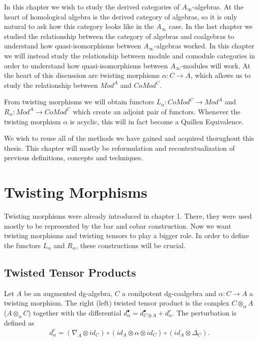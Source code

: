 \documentclass[../thesis.tex]{subfiles}
\begin{document}
    In this chapter we wish to study the derived categories of $A_\infty$-algebras. At the heart of homological algebra is the derived category of algebras, so it is only natural to ask how this category looks like in the $A_\infty$ case. In the last chapter we studied the relationship between the category of algebras and coalgebras to understand how quasi-isomorphisms between $A_\infty$-algebras worked. In this chapter we will instead study the relationship between module and comodule categories in order to understand how quasi-isomorphisms between $A_\infty$-modules will work. At the heart of this discussion are twisting morphisms $\alpha : C \rightarrow A$, which allows us to study the relationship between $Mod^A$ and $CoMod^C$.

    From twisting morphisms we will obtain functors $L_\alpha : CoMod^C \rightarrow Mod^A$ and $R_\alpha : Mod^A \rightarrow CoMod^C$ which create an adjoint pair of functors. Whenever the twisting morphism $\alpha$ is acyclic, this will in fact become a Quillen Equivalence.

    We wish to reuse all of the methods we have gained and acquired thorughout this thesis. This chapter will mostly be reformulation and recontextualization of previous definitions, concepts and techniques. 

    \section{Twisting Morphisms}

        Twisting morphisms were already introduced in chapter 1. There, they were used mostly to be represented by the bar and cobar construction. Now we want twisting morphisms and twisting tensors to play a bigger role. In order to define the functors $L_\alpha$ and $R_\alpha$, these constructions will be crucial.  

        \subsection{Twisted Tensor Products}

            Let $A$ be an augmented dg-algebra, $C$ a conilpotent dg-coalgebra and $\alpha : C \rightarrow A$ a twisting morphism. The right (left) twisted tensor product is the complex $C \otimes_\alpha A$ ($A\otimes_\alpha C$) together with the differential $d_\alpha^\bullet = d_{C\otimes A}^\bullet + d_\alpha^r$. The perturbation is defined as
            \begin{align*}
                d_\alpha^r = (\nabla_A\otimes id_C) \circ (id_A \otimes \alpha \otimes id_C) \circ (id_A \otimes \Delta_C).
            \end{align*}
\end{document}
